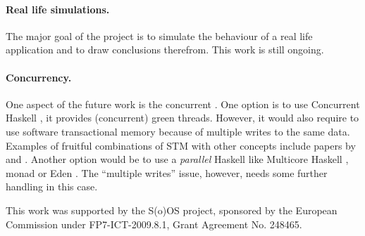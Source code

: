 \paragraph{Real life simulations.} The major goal of the project is to
simulate the behaviour of a real life application and to draw
conclusions therefrom. This work is still ongoing.

\paragraph{Concurrency.} One aspect of the future work is the
concurrent \soosim. One option is to use Concurrent Haskell
\cite{ConcHs}, it provides (concurrent) green threads. However, it
would also require to use software transactional memory
\cite{springerlink:10.1007/s004460050028} because of multiple writes
to the same data. Examples of fruitful combinations of STM
 with other concepts include papers by
\citeauthor{Harris:2008:CMT:1378704.1378725}
\cite{Harris:2008:CMT:1378704.1378725} and
\citeauthor{Bieniusa:2010:BAA:1835698.1835714}
\cite{Bieniusa:2010:BAA:1835698.1835714}.  Another option would be to
use a \emph{parallel} Haskell like Multicore Haskell
\cite{marlow:rsm},  monad \cite{par-monad} or Eden
\cite{eden}. The ``multiple writes'' issue, however, needs some
further handling in this case.

%

\acks

This work was supported by the S(o)OS project, sponsored by the
European Commission under FP7-ICT-2009.8.1, Grant Agreement
No. 248465.


